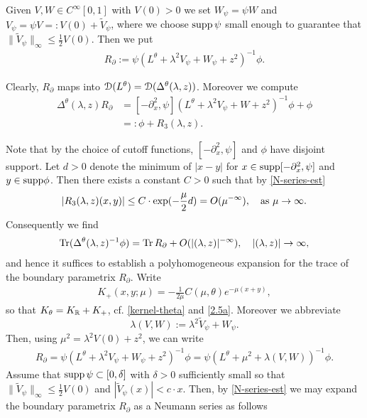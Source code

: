 Given $V,W\in C^\infty[0,1]$ with $V(0) >0$ we set $W_\psi=\psi W$ and
$V_\psi=\psi V=: V(0) + \widetilde{V}_\psi$, where we choose $\textup{supp} \, \psi$ 
small enough to guarantee that $\|\widetilde{V}_\psi\|_\infty \leq \frac{1}{2} V(0)$. Then we put
\begin{align*}
 R_{\partial} := \psi (L^\theta + \lambda^2V_\psi + W_\psi + z^2)^{-1} \phi.
\end{align*}

Clearly, $R_{\partial}$ maps into $\operatorname{\mathcal{D}} (L^\theta)=\operatorname{\mathcal{D}} (\Delta^\theta(\lambda,z))$. Moreover we compute 
\begin{align*}
\Delta^\theta(\lambda,z)R_{\partial} &= [-\partial_x^2 ,\psi] 
(L^\theta + \lambda^2V_\psi + W + z^2)^{-1} \phi + \phi\\
&=:\phi + R_3(\lambda,z).
\end{align*}

Note that by the choice of cutoff functions, $[-\partial_x^2, \psi]$ 
and $\phi$ have disjoint support. Let $d>0$ denote the minimum of 
$|x-y|$ for $x\in \textup{supp}[-\partial_x^2, \psi]$ and 
$y\in \textup{supp}\phi$. Then there exists a constant $C>0$ such that by \eqref{N-series-est}
\begin{align*}
\left| R_3(\lambda,z) (x,y) \right| 
\leq C \cdot 
\exp (-\frac{\mu}{2}d)= O(\mu^{-\infty}), \quad \textup{as} \ \mu\to \infty.
\end{align*}
Consequently we find 
\begin{align}
 \operatorname{Tr}(\Delta^\theta(\lambda,z)^{-1}\phi) = \operatorname{Tr} R_{\partial} + O(|(\lambda,z)|^{-\infty}), 
\quad |(\lambda,z)| \to \infty,
\end{align}
and hence it suffices to establish a polyhomogeneous expansion for the 
trace of the boundary parametrix $R_{\partial}$. Write 
\begin{align*}
 K_+ (x,y;\mu) = - \frac{1}{2\mu}C(\mu,\theta) e^{-\mu (x+y)},
\end{align*}
so that $K_\theta=K_{\mathbb{R}}+K_+$, cf. \eqref{kernel-theta} and \eqref{2.5a}. Moreover we abbreviate 
$$\lambda(V,W):=\lambda^2\widetilde{V}_\psi + W_\psi.$$ 
Then, using $\mu^2 = \lambda^2 V(0) + z^2$, we can write
\begin{align*}
 R_{\partial} = \psi (L^\theta + \lambda^2V_\psi + W_\psi + z^2)^{-1} \phi 
= \psi (L^\theta + \mu^2 + \lambda(V,W))^{-1} \phi.
\end{align*}
Assume 
that $\textup{supp}\, \psi\subset [0,\delta]$ with $\delta >0$
sufficiently small so that $\|\widetilde{V}_\psi\|_\infty \leq \frac{1}{2}V(0)$ 
and $|\widetilde{V}_\psi(x)|<c \cdot x$. Then, by \eqref{N-series-est} we may expand the boundary 
parametrix $R_\partial$ as a Neumann series as follows

